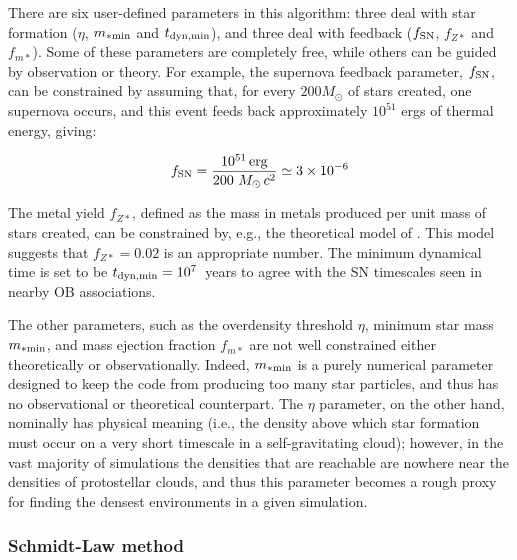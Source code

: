 There are six user-defined parameters in this algorithm: three deal
with star formation ($\eta$, $m_{\rm *min}$ and $t_{\rm
  dyn,min}$), and three deal with feedback ($f_{\rm SN}$, $f_{Z*}$ and
$f_{m*}$).  Some of these parameters are completely free, while others
can be guided by observation or theory.  For example, the supernova
feedback parameter, $f_{\rm SN}$, can be constrained by assuming that, for
every $200 M_\odot$ of stars created, one supernova occurs, and this
event feeds back approximately $10^{51}$ ergs of thermal energy,
giving:

\begin{equation}
f_{\rm SN} = \frac{10^{51}\, \mathrm{erg}}{200~M_\odot\, c^2} \simeq 3 \times 10^{-6}
\end{equation}

The metal yield $f_{Z*}$, defined as the mass in metals produced per
unit mass of stars created, can be constrained by, e.g., the
theoretical model of \citet{1995ApJS..101..181W}.  This model suggests
that $f_{Z*} = 0.02$ is an appropriate number.  The minimum dynamical
time is set to be $t_{\rm dyn,min} = 10^7$~years to agree with the SN timescales
seen in nearby OB associations.

The other parameters, such as the overdensity threshold $\eta$,
minimum star mass $m_{\rm *min}$, and mass ejection fraction $f_{m*}$ are
not well constrained either theoretically or observationally.  Indeed,
$m_{\rm *min}$ is a purely numerical parameter designed to keep the code
from producing too many star particles, and thus has no observational
or theoretical counterpart.  The $\eta$ parameter, on the other hand,
nominally has physical meaning (i.e., the density above which star
formation must occur on a very short timescale in a self-gravitating
cloud); however, in the vast majority of simulations the densities
that are reachable are nowhere near the densities of protostellar
clouds, and thus this parameter becomes a rough proxy for finding the
densest environments in a given simulation.  

\subsubsection{Schmidt-Law method}
\label{sec:starform_kravtsov}

